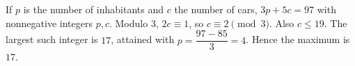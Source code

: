 If $p$ is the number of inhabitants and $c$ the number of cars, $3p+5c=97$ with nonnegative integers $p,c$. Modulo $3$, $2c\equiv1$, so $c\equiv2\pmod3$. Also $c\le19$. The largest such integer is $17$, attained with $p=\dfrac{97-85}{3}=4$. Hence the maximum is $\boxed{17}$.
